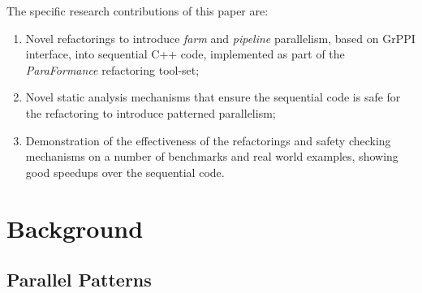 The specific research contributions of this paper are:
\begin{enumerate}
    \item Novel refactorings to introduce \emph{farm} and \emph{pipeline} parallelism, based on GrPPI interface, into sequential C++ code, implemented as part of the \emph{ParaFormance} refactoring tool-set;
    \item Novel static analysis mechanisms that ensure the sequential code is safe for the refactoring to introduce patterned parallelism;
    \item Demonstration of the effectiveness of the refactorings and safety checking mechanisms on a number of benchmarks and real world examples, showing good speedups over the sequential code.
\end{enumerate}




\section{Background}
\label{background}

\subsection{Parallel Patterns}



